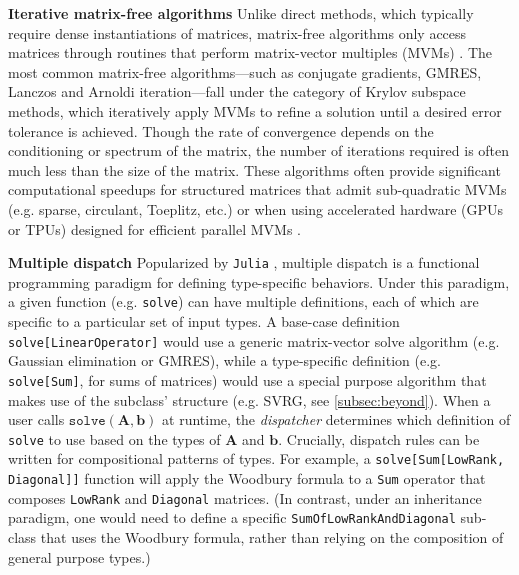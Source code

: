 \documentclass{article}
\newcommand{\mbf}[1]{{\boldsymbol{\mathbf{#1}}}}
\renewcommand{\bm}{\mbf}
\begin{document}
\textbf{Iterative matrix-free algorithms} \quad
Unlike direct methods, which typically require dense instantiations of matrices,
matrix-free algorithms only access matrices through routines that perform matrix-vector multiples (MVMs) \citep[e.g.][]{saad2003iterative}.
The most common matrix-free algorithms---such as conjugate gradients, GMRES, Lanczos and Arnoldi iteration---fall under the category of Krylov subspace methods, which iteratively apply MVMs to refine a solution until a desired error tolerance is achieved.
Though the rate of convergence depends on the conditioning or spectrum of the matrix,
the number of iterations required is often much less than the size of the matrix.
These algorithms often provide significant computational speedups for structured matrices that admit sub-quadratic MVMs (e.g. sparse, circulant, Toeplitz, etc.) or when using accelerated hardware (GPUs or TPUs) designed for efficient parallel MVMs \citep[e.g.][]{charlier2021kernel,gardner2018gpytorch,wang2019exact}.

\textbf{Multiple dispatch} \quad
Popularized by \texttt{Julia} \citep{bezanson2014julia}, multiple dispatch is a functional programming paradigm for defining type-specific behaviors.
Under this paradigm, a given function (e.g. \texttt{solve}) can have multiple definitions, each of which are specific to a particular set of input types.
A base-case definition \texttt{solve[LinearOperator]} would use a generic matrix-vector solve algorithm (e.g. Gaussian elimination or GMRES),
while a type-specific definition (e.g. \texttt{solve[Sum]}, for sums of matrices) would use a special purpose algorithm that makes use of the subclass' structure (e.g. SVRG, see \autoref{subsec:beyond}).
When a user calls $\texttt{solve}(\bm A, \bm b)$ at runtime,
the \emph{dispatcher} determines which definition of \texttt{solve} to use based on the types of $\bm A$ and $\bm b$.
Crucially, dispatch rules can be written for compositional patterns of types.
For example, a \texttt{solve[Sum[LowRank, Diagonal]]} function will apply the Woodbury formula to a \texttt{Sum} operator that composes \texttt{LowRank} and \texttt{Diagonal} matrices.
(In contrast, under an inheritance paradigm, one would need to define a specific \texttt{SumOfLowRankAndDiagonal} sub-class that uses the Woodbury formula,
rather than relying on the composition of general purpose types.)
\end{document}
